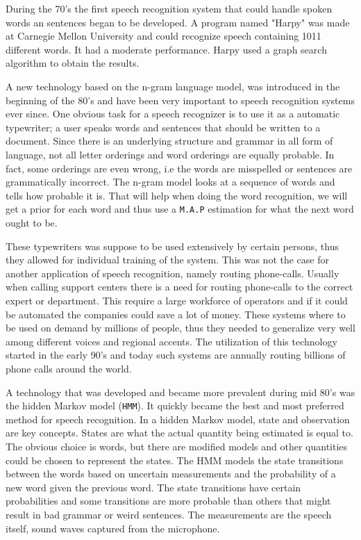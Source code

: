 \documentclass[a4paper,12pt,twoside]{ltxdoc}
\begin{document}
During the 70's the first speech recognition system that could handle spoken words an sentences began to be developed. A program named "Harpy" was made at Carnegie Mellon University and could recognize speech containing 1011 different words. It had a moderate performance. Harpy used a graph search algorithm to obtain the results. 

A new technology based on the n-gram language model, was introduced in the beginning of the 80's and have been very important to speech recognition systems ever since. One obvious task for a speech recognizer is to use it as a automatic typewriter; a user speaks words and sentences that should be written to a document. Since there is an underlying structure and grammar in all form of language, not all letter orderings and word orderings are equally probable. In fact, some orderings are even wrong, i.e the words are misspelled or sentences are grammatically incorrect. The n-gram model looks at a sequence of words and tells how probable it is. That will help when doing the word recognition, we will get a prior for each word and thus use a \verb#M.A.P# estimation for what the next word ought to be.

These typewriters was suppose to be used extensively by certain persons, thus they allowed for individual training of the system. This was not the case for another application of speech recognition, namely routing phone-calls. Usually when calling support centers there is a need for routing phone-calls to the correct expert or department. This require a large workforce of operators and if it could be automated the companies could save a lot of money. These systems where to be used on demand by millions of people, thus they needed to generalize very well among different voices and regional accents. The utilization of this technology started in the early 90's and today such systems are annually routing billions of phone calls around the world. 

A technology that was developed and became more prevalent during mid 80's was the hidden Markov model (\verb#HMM#). It quickly became the best and most preferred method for speech recognition. In a hidden Markov model, state and observation are key concepts. States are what the actual quantity being estimated is equal to. The obvious choice is words, but there are modified models and other quantities could be chosen to represent the states. The HMM models the state transitions between the words based on uncertain measurements and the probability of a new word given the previous word. The state transitions have certain probabilities and some transitions are more probable than others that might result in bad grammar or weird sentences.  The measurements are the speech itself, sound waves captured from the microphone\cite{history}.
\end{document}
